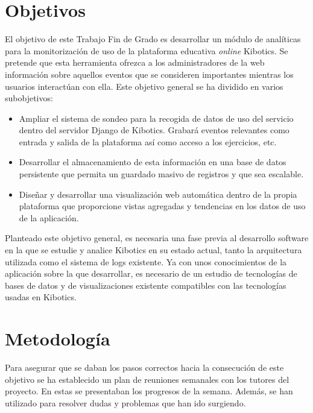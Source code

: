 \documentclass[a4paper, 12pt]{book}
\begin{document}
	\section{Objetivos}
	\label{sec:objetivos}
		El objetivo de este Trabajo Fin de Grado es desarrollar un módulo de analíticas para la monitorización de uso de la plataforma educativa \textit{online} Kibotics. Se pretende que esta herramienta ofrezca a los administradores de la web información sobre aquellos eventos que se consideren importantes mientras los usuarios interactúan con ella. Este objetivo general se ha dividido en varios subobjetivos:
		
		\begin{itemize}
			\item Ampliar el sistema de sondeo para la recogida de datos de uso del servicio dentro del servidor Django de Kibotics. Grabará eventos relevantes como entrada y salida de la plataforma así como acceso a los ejercicios, etc.
			\item Desarrollar el almacenamiento de esta información en una base de datos persistente que permita un guardado masivo de registros y que sea escalable.
			\item Diseñar y desarrollar una visualización web automática dentro de la propia plataforma que proporcione vistas agregadas y tendencias en los datos de uso de la aplicación.
		\end{itemize}
	
		Planteado este objetivo general, es necesaria una fase previa al desarrollo software en la que se estudie y analice Kibotics en su estado actual, tanto la arquitectura utilizada como el sistema de logs existente. Ya con unos conocimientos de la aplicación sobre la que desarrollar, es necesario de un estudio de tecnologías de bases de datos y de visualizaciones existente compatibles con las tecnologías usadas en Kibotics. \\
			
		
	\section{Metodología}
	\label{sec:metodologia}
				
		Para asegurar que se daban los pasos correctos hacia la consecución de este objetivo se ha establecido un plan de reuniones semanales con los tutores del proyecto. En estas se presentaban los progresos de la semana. Además, se han utilizado para resolver dudas y problemas que han ido surgiendo.\\
		
\end{document}
